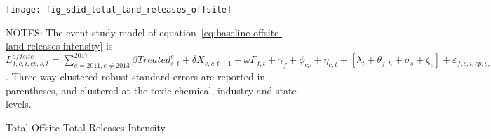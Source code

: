 \begin{figure}[H]
    \centering
    \texttt{[image: fig\_sdid\_total\_land\_releases\_offsite]}
    \caption{Total Offsite Total Releases Intensity}
    \label{fig:baseline-offsite-land-releases-intensity}
    \begin{minipage}{12cm}
        \vspace{0.05in}
        NOTES: The event study model of equation~\ref{eq:baseline-offsite-land-releases-intensity} is $L_{f,c,i,cp,s,t}^{offsite} = \sum_{{e = 2011},{e \neq 2013}}^{2017} \beta Treated_{s,t}^e + \delta X_{v,c,t-1} + \omega F_{f,t} + \gamma_{f} + \phi_{cp} + \eta_{c,t} + \left[\lambda_{t} + \theta_{f,h} + \sigma_{s} + \zeta_{c} \right] + \varepsilon_{f,c,i,cp,s,t}$. Three-way clustered robust standard errors are reported in parentheses, and clustered at the toxic chemical, industry and state levels.
    \end{minipage}
\end{figure}